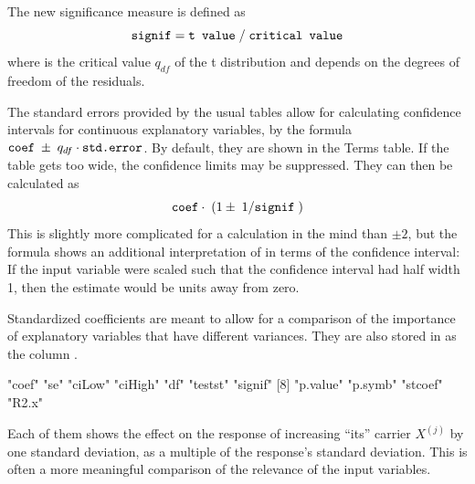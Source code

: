 \documentclass[11pt]{article}
\begin{document}
The new significance measure is defined as
\[
  \texttt{signif} = \texttt{t value}\;/\; \texttt{critical value}
\]
where  is the critical value $q_{df}$ of the 
t distribution and depends on the degrees of freedom of the residuals. 

The standard errors provided by the usual  tables allow for
calculating confidence intervals for continuous explanatory variables,
by the formula $\texttt{coef} \;\pm\; q_{df}\cdot\texttt{std.error}$.
By default, they are shown in the Terms table. 
If the table gets too wide, the confidence limits may be suppressed.
They can then be calculated as
\[
  \texttt{coef}\cdot\;(1\pm\;1/\texttt{signif}\;)
\]
This is slightly more complicated for a calculation in the mind than
$\pm 2$, 
but the formula shows an additional interpretation of  
in terms of the confidence interval:
If the input variable were scaled such that the confidence interval had 
half width 1, then the estimate would be  units away from zero.

Standardized coefficients are meant to allow for a comparison of the 
importance of explanatory variables that have different variances.
They are also stored in  as the column .

\begin{Schunk}
\begin{Soutput}
 [1] "coef"    "se"      "ciLow"   "ciHigh"  "df"      "testst"  "signif" 
 [8] "p.value" "p.symb"  "stcoef"  "R2.x"   
\end{Soutput}
\end{Schunk}
Each of them shows the effect on the response of increasing ``its'' 
carrier $X^{(j)}$ by one standard deviation, as a multiple 
of the response's standard deviation. 
This is often a more meaningful comparison of the relevance of the input
variables. 
\end{document}
